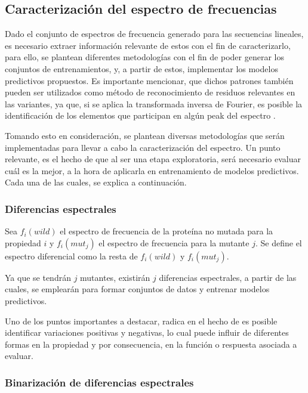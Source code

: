 \subsection{Caracterización del espectro de frecuencias}

Dado el conjunto de espectros de frecuencia generado para las secuencias lineales, es necesario extraer información relevante de estos con el fin de caracterizarlo, para ello, se plantean diferentes metodologías con el fin de poder generar los conjuntos de entrenamientos, y, a partir de estos, implementar los modelos predictivos propuestos. Es importante mencionar, que dichos patrones también pueden ser utilizados como método de reconocimiento de residuos relevantes en las variantes, ya que, si se aplica la transformada inversa de Fourier, es posible la identificación de los elementos que participan en algún peak del espectro \cite{veljkovic1985possible}.

Tomando esto en consideración, se plantean diversas metodologías que serán implementadas para llevar a cabo la caracterización del espectro. Un punto relevante, es el hecho de que al ser una etapa exploratoria, será necesario evaluar cuál es la mejor, a la hora de aplicarla en entrenamiento de modelos predictivos. Cada una de las cuales, se explica a continuación.

\subsubsection{Diferencias espectrales}
 
Sea $f_i(wild)$ el espectro de frecuencia de la proteína no mutada para la propiedad $i$ y $f_i(mut_{j})$ el espectro de frecuencia para la mutante $j$. Se define el espectro diferencial como la resta de $f_i(wild)$ y $f_i(mut_{j})$.

Ya que se tendrán $j$ mutantes, existirán $j$ diferencias espectrales, a partir de las cuales, se emplearán para formar conjuntos de datos y entrenar modelos predictivos.

Uno de los puntos importantes a destacar, radica en el hecho de es posible identificar variaciones positivas y negativas, lo cual puede influir de diferentes formas en la propiedad y por consecuencia, en la función o respuesta asociada a evaluar.

\subsubsection{Binarización de diferencias espectrales}

